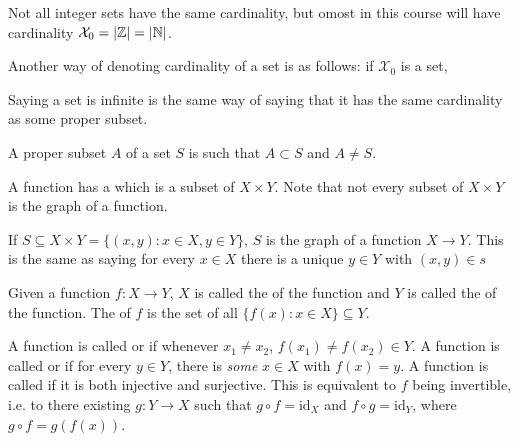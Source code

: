 \documentclass[12pt]{scrartcl}
\begin{document}
\begin{remark}
    Not all integer sets have the same cardinality, but omost in this course will have cardinality $\mathcal{X}_0 = |\mathbb Z| = |\mathbb N|$.
\end{remark}

\begin{remark}
    Another way of denoting cardinality of a set is as follows: if $\mathcal{X}_0$ is a set, 
\end{remark}

\begin{fact}
    Saying a set is infinite is the same way of saying that it has the same cardinality as some proper subset.
\end{fact}

\begin{definition}
    A proper subset $A$ of a set $S$ is such that $A \subset S$ and $A \neq S$.
\end{definition}

\begin{definition}
    A function has a  which is a subset of $X \times Y$. Note that not every subset of $X \times Y$ is the graph of a function.
\end{definition}

\begin{definition}
    If $S \subseteq X \times Y = \{(x, y) : x \in X, y \in Y\}$, $S$ is the graph of a function $X \to Y$. This is the same as saying for every $x \in X$ there is a unique $y \in Y$ with $(x, y) \in s$
\end{definition}

\begin{definition}
    Given a function $f : X \to Y$, $X$ is called the  of the function and $Y$ is called the  of the function. The  of $f$ is the set of all $\{f(x) : x \in X\} \subseteq Y$.
\end{definition}

\begin{definition}
    A function is called  or  if whenever $x_1 \neq x_2$, $f(x_1) \neq f(x_2) \in Y$. A function is called  or  if for every $y \in Y$, there is \textit{some} $x \in X$ with $f(x) = y$. A function is called  if it is both injective and surjective. This is equivalent to $f$ being invertible, i.e. to there existing $g : Y \to X$ such that $g \circ f = \text{id}_X$ and $f \circ g = \text{id}_Y$, where $g \circ f = g(f(x))$.
\end{definition}
\end{document}
